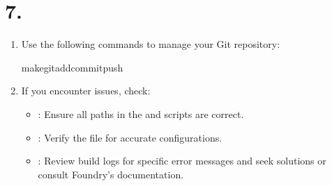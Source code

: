 \documentclass[a4paper,10pt,english]{sphinxmanual}
\begin{document}
\section{7. }
\label{\detokenize{quickstart:common-tasks}}\label{\detokenize{quickstart:troubleshooting}}\begin{enumerate}
%
\item {} 
\sphinxAtStartPar
{}

\sphinxAtStartPar
Use the following commands to manage your Git repository:

\begin{sphinxVerbatim}[commandchars=\\\{\}]
makegit\PYGZhy{}add\PYGZhy{}commit\PYGZhy{}push
\end{sphinxVerbatim}

\item {} 
\sphinxAtStartPar
{}

\sphinxAtStartPar
If you encounter issues, check:
\begin{itemize}
\item {} 
\sphinxAtStartPar
{}: Ensure all paths in the  and scripts are correct.

\item {} 
\sphinxAtStartPar
{}: Verify the  file for accurate configurations.

\item {} 
\sphinxAtStartPar
{}: Review build logs for specific error messages and seek solutions or consult Foundry’s documentation.

\end{itemize}

\end{enumerate}
\end{document}
